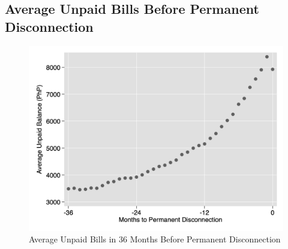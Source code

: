 \documentclass[12pt]{article}
\begin{document}
\subsection{Average Unpaid Bills Before Permanent Disconnection}\label{section:billtodc}


\begin{figure}
\caption{Average Unpaid Bills in 36 Months Before Permanent Disconnection}\label{figure:billtodc}
\begin{center}
\includegraphics[scale=.4]{tables/pay_to_dc_graph.png}
\end{center}
\end{figure}



\end{document}

